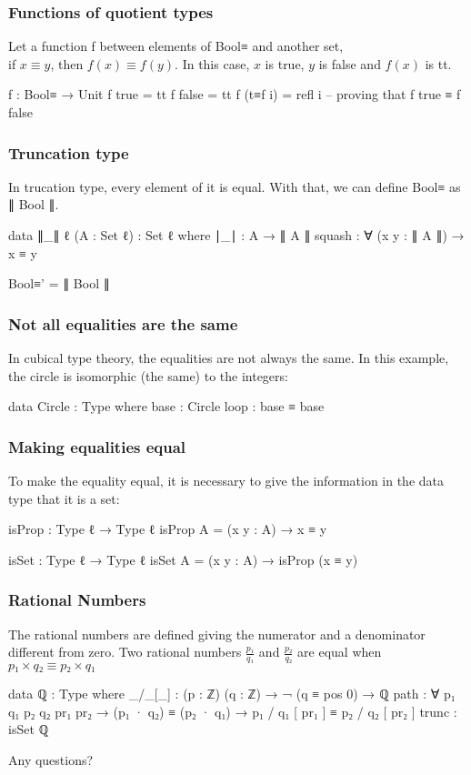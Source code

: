 \documentclass{beamer}
\begin{document}
\begin{frame}
  \frametitle{Functions of quotient types}
  Let a function f between elements of Bool≡ and another set, \\
  if $ x \equiv y $, then $ f(x) \equiv f(y) $.
  In this case, $ x $ is true, $ y $ is false and $ f(x) $ is tt.
  \begin{code}
  f : Bool≡ → Unit
  f true    = tt
  f false   = tt
  f (t≡f i) = refl i -- proving that f true ≡ f false
  \end{code}

\end{frame}

\begin{frame}
  \frametitle{Truncation type}

  In trucation type, every element of it is equal.
  With that, we can define Bool≡ as ∥ Bool ∥.

  \begin{code}
  data ∥_∥ {ℓ} (A : Set ℓ) : Set ℓ where
    ∣_∣ : A → ∥ A ∥
    squash : ∀ (x y : ∥ A ∥) → x ≡ y

  Bool≡' = ∥ Bool ∥
  \end{code}
\end{frame}

\begin{frame}
  \frametitle{Not all equalities are the same}
  In cubical type theory, the equalities are not always the same.
  In this example, the circle is isomorphic (the same) to the integers:
  \begin{code}
  data Circle : Type where
    base : Circle
    loop : base ≡ base
  \end{code}
\end{frame}

\begin{frame}
  \frametitle{Making equalities equal}
  To make the equality equal, it is necessary to give the information in the data type that it is a set:
  \begin{code}
  isProp : Type ℓ → Type ℓ
  isProp A = (x y : A) → x ≡ y

  isSet : Type ℓ → Type ℓ
  isSet A = (x y : A) → isProp (x ≡ y)
  \end{code}
\end{frame}

\begin{frame}
  \frametitle{Rational Numbers}
  The rational numbers are defined giving the numerator and a denominator different from zero.
  Two rational numbers $ \frac{p₁}{q₁} $ and $ \frac{p₂}{q₂} $ are equal when $ p₁ \times q₂ \equiv p₂ \times q₁ $
  \begin{code}
  data ℚ : Type where
    _/_[_] : (p : ℤ) (q : ℤ) → ¬ (q ≡ pos 0) → ℚ
    path : ∀ p₁ q₁ p₂ q₂ {pr₁ pr₂} → (p₁ · q₂) ≡ (p₂ · q₁)
      → p₁ / q₁ [ pr₁ ] ≡ p₂ / q₂ [ pr₂ ]
    trunc : isSet ℚ
  \end{code}
\end{frame}

\begin{frame}
  \vspace*{36 pt}
  \begin{center}
  {\Huge Any questions?}
  \end{center}
\end{frame}
\end{document}
